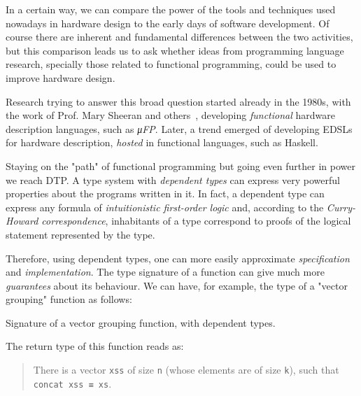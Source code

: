 \documentclass[a4paper,draft]{report}
\begin{document}

        In a certain way, we can compare the power of the tools and techniques
        used nowadays in hardware design to the early days of software development.
        Of course there are inherent and fundamental differences between the two activities, but
        this comparison leads us to ask whether ideas from programming language research,
        specially those related to functional programming, could be used to improve hardware design.

        Research trying to answer this broad question started already in the 1980s,
        with the work of Prof. Mary Sheeran and others~\cite{sheeran-survey},
        developing \emph{functional} hardware description languages, such as \emph{μFP}.
        Later, a trend emerged of developing \acp{EDSL} for hardware description,
        \emph{hosted} in functional languages, such as Haskell.

        Staying on the "path" of functional programming but going even further in power we reach \ac{DTP}.
        A type system with \emph{dependent types} can express very powerful properties about the programs written in it.
        In fact, a dependent type can express any formula of \emph{intuitionistic first-order logic} and,
        according to the \emph{Curry-Howard correspondence},
        inhabitants of a type correspond to proofs of the logical statement represented by the type.

        Therefore, using dependent types, one can more easily approximate \emph{specification} and \emph{implementation}.
        The type signature of a function can give much more \emph{guarantees} about its behaviour.
        We can have, for example, the type of a "vector grouping" function as follows:

        \begin{listing}[h]
            \caption{Signature of a vector grouping function, with dependent types. \label{lst:group-decl}}
        \end{listing}

        The return type of this function reads as:
        \begin{quote}
            There is a vector \texttt{xss} of size \texttt{n}
            (whose elements are of size \texttt{k}), such that \texttt{concat xss ≡ xs}.
        \end{quote}
\end{document}

